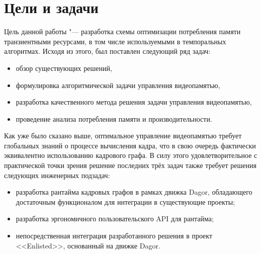 \section{Цели и задачи}
Цель данной работы "--- разработка схемы оптимизации потребления памяти транзиентными ресурсами, в том числе используемыми в темпоральных алгоритмах. Исходя из этого, был поставлен следующий ряд задач:
\begin{itemize}
    \item обзор существующих решений,
    \item формулировка алгоритмической задачи управления видеопамятью,
    \item разработка качественного метода решения задачи управления видеопамятью,
    \item проведение анализа потребления памяти и производительности.
\end{itemize}
Как уже было сказано выше, оптимальное управление видеопамятью требует глобальных знаний о процессе вычисления кадра, что в свою очередь фактически эквивалентно использованию кадрового графа.
В силу этого удовлетворительное с практической точки зрения решение последних трёх задач также требует решения следующих инженерных подзадач:
\begin{itemize}
    \item разработка рантайма кадровых графов в рамках движка Dagor, обладающего достаточным функционалом для интеграции в существующие проекты;
    \item разработка эргономичного пользовательского API для рантайма;
    \item непосредственная интеграция разработанного решения в проект <<Enlisted>>, основанный на движке Dagor.
\end{itemize}
